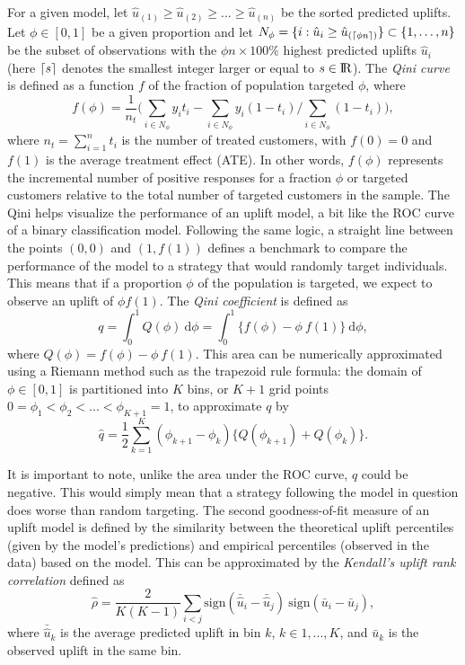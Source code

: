 \documentclass{article}
\def \real{\rm I\!R}
\DeclarePairedDelimiter{\ceil}{\lceil}{\rceil}
\begin{document}
For a given model, let $\hat{u}_{(1)} \geq \hat{u}_{(2)} \geq ... \geq \hat{u}_{(n)}$ be the sorted predicted uplifts. Let $\phi \in [0,1]$ be a given proportion and let $ N_{\phi} = \{i: \hat{u}_{i} \geq \hat{u}_{(\ceil{\phi n})} \} \subset \lbrace 1, \ldots, n \rbrace$ be the subset of observations with the $\phi n \times 100 \%$ highest predicted uplifts $\hat{u}_i$ (here $\ceil{s}$ denotes the smallest integer larger or equal to $s\in \real$). The \textit{Qini curve} is defined as a function $f$ of the fraction of population targeted $\phi$, where 
\begin{equation*}
    f(\phi) = \frac{1}{n_t}\biggl(\sum\limits_{i \in  N_{\phi}} y_i t_i - \sum\limits_{i \in  N_{\phi}} y_i (1-t_i) / \sum\limits_{i \in  N_{\phi}} (1-t_i) \biggr),
\end{equation*}
where $n_t = \sum_{i=1}^n t_i$ is the number of treated customers, with $f(0)=0$ and $f(1)$ is the average treatment effect (ATE). In other words, $f(\phi)$ represents the incremental number of positive responses for a fraction $\phi$ or targeted customers relative to the total number of targeted customers in the sample. The Qini helps visualize the performance of an uplift model, a bit like the ROC curve of a binary classification model. Following the same logic, a straight line between the points $(0,0)$ and $(1, f(1))$ defines a benchmark to compare the performance of the model to a strategy that would randomly target individuals. This means that if a proportion $\phi$ of the population is targeted, we expect to observe an uplift of $\phi f(1)$.
The {\it Qini coefficient} is defined as
\begin{equation*}
     q = \int_0^1 Q(\phi) ~\mathrm{d}\phi = \int_0^1 \{f(\phi) - \phi~f(1)\} ~\mathrm{d}\phi,
\end{equation*}
where $Q(\phi) = f(\phi) - \phi~f(1)$. This area can be numerically approximated using a Riemann method such as the trapezoid rule formula: the domain of $\phi \in [0,1]$ is partitioned into $K$ bins, or $K+1$ grid points $0=\phi_1 < \phi_2 < ... < \phi_{K+1} = 1$, to approximate $q$ by
\begin{equation}
  \hat{q} = \dfrac{1}{2} \sum_{k=1}^K (\phi_{k+1}-\phi_k)\{Q(\phi_{k+1}) + Q(\phi_{k})\}.
  \label{eq:q:hat}
\end{equation}

It is important to note, unlike the area under the ROC curve, $\hat{q}$ could be negative. This would simply mean that a strategy following the model in question does worse than random targeting. The second goodness-of-fit measure of an uplift model is defined by the similarity between the theoretical uplift percentiles (given by the model's predictions) and empirical percentiles (observed in the data) based on the model. This can be approximated by the {\it Kendall's uplift rank correlation} \citep{belba2019qbased} defined as
\begin{equation}
    \hat{\rho} = \frac{2}{K(K-1)} \sum_{i<j} \mathrm{sign}(\bar{\hat{u}}_i - \bar{\hat{u}}_j)~\mathrm{sign}(\bar{u}_i - \bar{u}_j),
    \label{eq:corr_coeff}
\end{equation}
where $\bar{\hat{u}}_k$ is the average predicted uplift in bin $k$,  $k \in {1,...,K}$, and $\bar{u}_k$ is the observed uplift in the same bin. 
\end{document}
